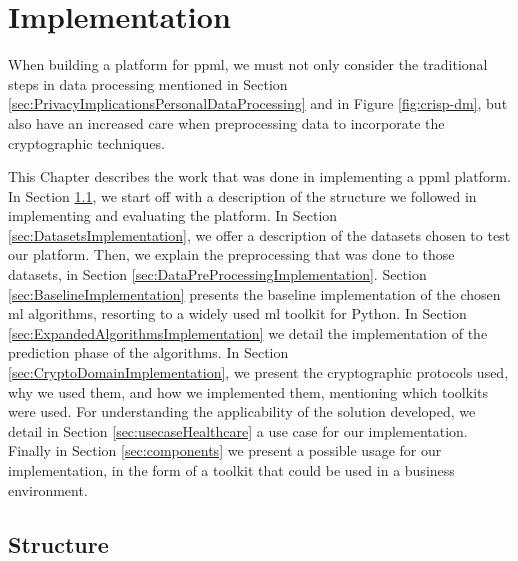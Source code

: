 %

\acresetall

\chapter{Implementation}
\label{ch:Implementation}

When building a platform for \ac{ppml}, we must not only consider the traditional steps in data processing mentioned in Section \ref{sec:PrivacyImplicationsPersonalDataProcessing} and in Figure \ref{fig:crisp-dm}, but also have an increased care when preprocessing data to incorporate the cryptographic techniques.

This Chapter describes the work that was done in implementing a \ac{ppml} platform. In Section \ref{sec:StructureImplementation}, we start off with a description of the structure we followed in implementing and evaluating the platform.
In Section \ref{sec:DatasetsImplementation}, we offer a description of the datasets chosen to test our platform. Then, we explain the preprocessing that was done to those datasets, in Section \ref{sec:DataPreProcessingImplementation}.
Section \ref{sec:BaselineImplementation} presents the baseline implementation of the chosen \ac{ml} algorithms, resorting to a widely used \ac{ml} toolkit for Python.
In Section \ref{sec:ExpandedAlgorithmsImplementation} we detail the implementation of the prediction phase of the algorithms.
In Section \ref{sec:CryptoDomainImplementation}, we present the cryptographic protocols used, why we used them, and how we implemented them, mentioning which toolkits were used.
For understanding the applicability of the solution developed, we detail in Section \ref{sec:usecaseHealthcare} a use case for our implementation. Finally in Section \ref{sec:components} we present a possible usage for our implementation, in the form of a toolkit that could be used in a business environment.



\section{Structure}
\label{sec:StructureImplementation}

